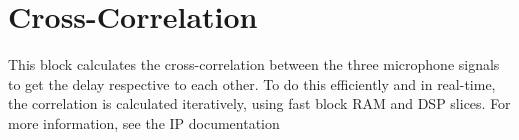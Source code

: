 \section{Cross-Correlation}
\label{sec::xcorr}

This block calculates the cross-correlation between the three microphone signals to get the delay respective to each other.
To do this efficiently and in real-time, the correlation is calculated iteratively, using fast block RAM and DSP slices.
For more information, see the IP documentation